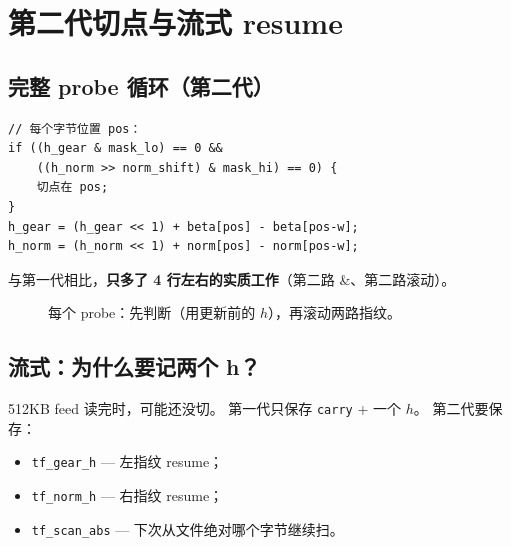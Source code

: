 \chapter{第二代切点与流式 resume}
\label{ch:gen2-cut-stream}

\section{完整 probe 循环（第二代）}

\begin{codebox}[ScanGearCut2F 逻辑（简化）]
\begin{lstlisting}
// 每个字节位置 pos：
if ((h_gear & mask_lo) == 0 &&
    ((h_norm >> norm_shift) & mask_hi) == 0) {
    切点在 pos;
}
h_gear = (h_gear << 1) + beta[pos] - beta[pos-w];
h_norm = (h_norm << 1) + norm[pos] - norm[pos-w];
\end{lstlisting}
\end{codebox}

与第一代相比，\textbf{只多了 4 行左右的实质工作}（第二路 \&、第二路滚动）。

\begin{figure}[htbp]
\centering
{}
\caption{每个 probe：先判断（用更新前的 $h$），再滚动两路指纹。}
\end{figure}

\section{流式：为什么要记两个 h？}

512KB feed 读完时，可能还没切。  
第一代只保存 \texttt{carry} + 一个 $h$。  
第二代要保存：

\begin{itemize}[nosep]
  \item \texttt{tf\_gear\_h} — 左指纹 resume；
  \item \texttt{tf\_norm\_h} — 右指纹 resume；
  \item \texttt{tf\_scan\_abs} — 下次从文件绝对哪个字节继续扫。
\end{itemize}


